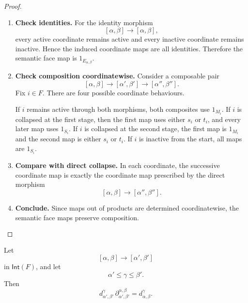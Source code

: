 \begin{proof}
    \leavevmode
    \begin{enumerate}
        \item \textbf{Check identities.}
        For the identity morphism
        \[
            [\alpha,\beta]\to[\alpha,\beta],
        \]
        every active coordinate remains active and every inactive coordinate
        remains inactive. Hence the induced coordinate maps are all
        identities. Therefore the semantic face map is
        \(1_{E_{\alpha,\beta}}\).

        \item \textbf{Check composition coordinatewise.}
        Consider a composable pair
        \[
            [\alpha,\beta]\to[\alpha',\beta']
            \to[\alpha'',\beta''].
        \]
        Fix \(i\in F\). There are four possible coordinate behaviours.

        If \(i\) remains active through both morphisms, both composites use
        \(1_{M_i}\). If \(i\) is collapsed at the first stage, then the first
        map uses either \(s_i\) or \(t_i\), and every later map uses
        \(1_{S_i}\). If \(i\) is collapsed at the second stage, the first
        map is \(1_{M_i}\) and the second map is either \(s_i\) or \(t_i\).
        If \(i\) is inactive from the start, all maps are \(1_{S_i}\).

        \item \textbf{Compare with direct collapse.}
        In each coordinate, the successive coordinate map is exactly the
        coordinate map prescribed by the direct morphism
        \[
            [\alpha,\beta]\to[\alpha'',\beta''].
        \]

        \item \textbf{Conclude.}
        Since maps out of products are determined coordinatewise, the semantic
        face maps preserve composition.
    \end{enumerate}
\end{proof}

\begin{proposition}
\label{prop:cmett-vertex-evaluation-face-compatibility}
    Let
    \[
        [\alpha,\beta]\to[\alpha',\beta']
    \]
    in \(\mathsf{Int}(F)\), and let
    \[
        \alpha'\leq\gamma\leq\beta'.
    \]
    Then
    \[
        d_{\alpha',\beta'}^\gamma\,
        \partial_{\alpha',\beta'}^{\alpha,\beta}
        =
        d_{\alpha,\beta}^\gamma.
    \]
\end{proposition}

